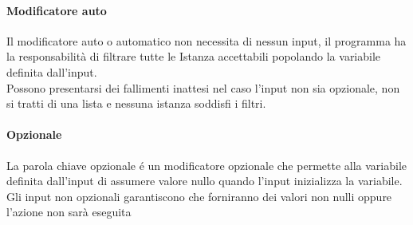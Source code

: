 \paragraph{Modificatore auto}
Il modificatore auto o automatico non necessita di nessun input, il programma ha la responsabilità di
filtrare tutte le Istanza accettabili popolando la variabile definita dall'input. \\
Possono presentarsi dei fallimenti inattesi nel caso l'input non sia opzionale,
non si tratti di una lista e nessuna istanza soddisfi i filtri.

\paragraph{Opzionale}
La parola chiave opzionale é un modificatore opzionale che permette alla variabile definita dall'input
di assumere valore nullo quando l'input inizializza la variabile. \\ 
Gli input non opzionali garantiscono che forniranno dei valori non nulli oppure l'azione non sarà eseguita

